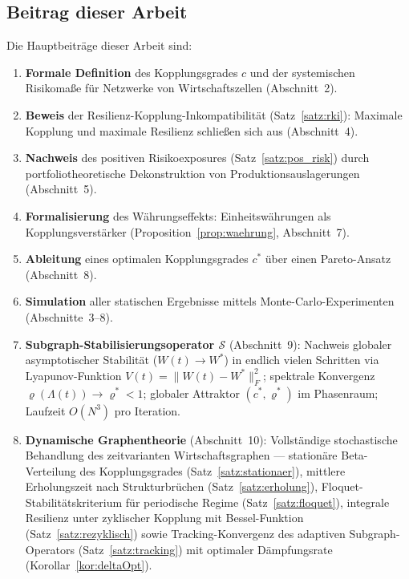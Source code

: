 ﻿\documentclass[a4paper,12pt]{article}
\theoremstyle{definition}
\begin{document}
\subsection{Beitrag dieser Arbeit}

Die Hauptbeiträge dieser Arbeit sind:

\begin{enumerate}
    \item \textbf{Formale Definition} des Kopplungsgrades $c$ und der systemischen Risikomaße
          für Netzwerke von Wirtschaftszellen (Abschnitt~2).
    \item \textbf{Beweis} der Resilienz-Kopplung-Inkompatibilität (Satz~\ref{satz:rki}):
          Maximale Kopplung und maximale Resilienz schließen sich aus (Abschnitt~4).
    \item \textbf{Nachweis} des positiven Risikoexposures (Satz~\ref{satz:pos_risk}) durch
          portfoliotheoretische Dekonstruktion von Produktionsauslagerungen (Abschnitt~5).
    \item \textbf{Formalisierung} des Währungseffekts: Einheitswährungen als
          Kopplungsverstärker (Proposition~\ref{prop:waehrung}, Abschnitt~7).
    \item \textbf{Ableitung} eines optimalen Kopplungsgrades $c^*$ über einen
          Pareto-Ansatz (Abschnitt~8).
    \item \textbf{Simulation} aller statischen Ergebnisse mittels Monte-Carlo-Experimenten
          (Abschnitte~3--8).
    \item \textbf{Subgraph-Stabilisierungsoperator $\mathcal{S}$} (Abschnitt~9):
          Nachweis globaler asymptotischer Stabilität ($W(t)\to W^*$) in endlich vielen
          Schritten via Lyapunov-Funktion $V(t)=\|W(t)-W^*\|_F^2$; spektrale Konvergenz
          $\varrho(\Lambda(t))\to\varrho^*<1$; globaler Attraktor $(c^*,\varrho^*)$
          im Phasenraum; Laufzeit $O(N^3)$ pro Iteration.
    \item \textbf{Dynamische Graphentheorie} (Abschnitt~10): Vollständige stochastische
          Behandlung des zeitvarianten Wirtschaftsgraphen --- stationäre Beta-Verteilung
          des Kopplungsgrades (Satz~\ref{satz:stationaer}), mittlere Erholungszeit nach
          Strukturbrüchen (Satz~\ref{satz:erholung}), Floquet-Stabilitätskriterium für
          periodische Regime (Satz~\ref{satz:floquet}), integrale Resilienz unter
          zyklischer Kopplung mit Bessel-Funktion (Satz~\ref{satz:rezyklisch}) sowie
          Tracking-Konvergenz des adaptiven Subgraph-Operators (Satz~\ref{satz:tracking})
          mit optimaler Dämpfungsrate (Korollar~\ref{kor:deltaOpt}).
\end{enumerate}
\end{document}
